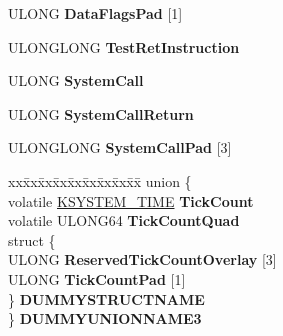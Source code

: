 \begin{DoxyCompactItemize}
\begin{tabbing}
\end{tabbing}\item 
\mbox{\label{struct___k_u_s_e_r___s_h_a_r_e_d___d_a_t_a_af0fb401ba718551c1b72879128ee7f56}} 
U\+L\+O\+NG {\bfseries Data\+Flags\+Pad} \mbox{[}1\mbox{]}
\item 
\mbox{\label{struct___k_u_s_e_r___s_h_a_r_e_d___d_a_t_a_a42d0a31b27671628a33232d8caee355f}} 
U\+L\+O\+N\+G\+L\+O\+NG {\bfseries Test\+Ret\+Instruction}
\item 
\mbox{\label{struct___k_u_s_e_r___s_h_a_r_e_d___d_a_t_a_a4033032d862fa01e535bd65b3009e96f}} 
U\+L\+O\+NG {\bfseries System\+Call}
\item 
\mbox{\label{struct___k_u_s_e_r___s_h_a_r_e_d___d_a_t_a_a302d0e562fd812ef127fe8fe7f0202b1}} 
U\+L\+O\+NG {\bfseries System\+Call\+Return}
\item 
\mbox{\label{struct___k_u_s_e_r___s_h_a_r_e_d___d_a_t_a_afb8f9a00a74b978acb68070148b35d7f}} 
U\+L\+O\+N\+G\+L\+O\+NG {\bfseries System\+Call\+Pad} \mbox{[}3\mbox{]}
\item 
\mbox{\label{struct___k_u_s_e_r___s_h_a_r_e_d___d_a_t_a_a8712af1735d307baf7d27d2bd83852ed}} 
\begin{tabbing}
xx\=xx\=xx\=xx\=xx\=xx\=xx\=xx\=xx\=\kill
union \{\\
\>volatile \hyperlink{struct___k_s_y_s_t_e_m___t_i_m_e}{KSYSTEM\_TIME} {\bfseries TickCount}\\
\>volatile ULONG64 {\bfseries TickCountQuad}\\
\>struct \{\\
\>\>ULONG {\bfseries ReservedTickCountOverlay} \mbox{[}3\mbox{]}\\
\>\>ULONG {\bfseries TickCountPad} \mbox{[}1\mbox{]}\\
\>\} {\bfseries DUMMYSTRUCTNAME}\\
\} {\bfseries DUMMYUNIONNAME3}\\


\end{tabbing}
\end{DoxyCompactItemize}
